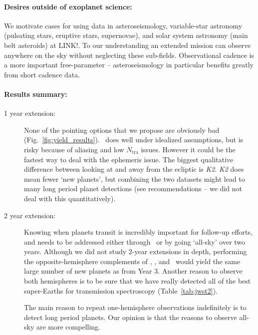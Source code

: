 \paragraph{Desires outside of exoplanet science:}
We motivate cases for using \tess data in asteroseismology, variable-star astronomy (pulsating stars, eruptive stars, supernovae), and solar system astronomy (main belt asteroids) at LINK!.
To our understanding an extended mission can observe anywhere on the sky without neglecting these sub-fields.
Observational cadence is a more important free-parameter -- asteroseismology in particular benefits greatly from short cadence data.


\paragraph{Results summary:}
\begin{description}
	\item[1 year extension:]
	None of the pointing options that we propose are obviously bad (Fig.~\ref{fig:yield_results}).
	\hemis\ does well under idealized assumptions, but is risky because of aliasing and low $N_\mathrm{tra}$ issues. 
	However it could be the fastest way to deal with the ephemeris issue.
	The biggest qualitative difference between looking at and away from the ecliptic is \textit{K2}.
	\textit{K2} does mean fewer `new \tess planets', but combining the two datasets might lead to many long period planet detections (see recommendations -- we did not deal with this quantitatively).
	
	\item[2 year extension:]
	Knowing when \tess planets transit is incredibly important for follow-up efforts, and needs to be addressed either through \hemis\ or by going `all-sky' over two years.
	Although we did not study 2-year extensions in depth, performing the opposite-hemisphere complements of \nhemi, \npole, and \shemiAvoid\ would yield the same large number of new planets as from Year 3.
	Another reason to observe both hemispheres is to be sure that we have really detected all of the best super-Earths for transmission spectroscopy (Table~\ref{tab:jwst2}).
	
	The main reason to repeat one-hemisphere observations indefinitely is to detect long period planets.
	Our opinion is that the reasons to observe all-sky are more compelling.
	
\end{description}



